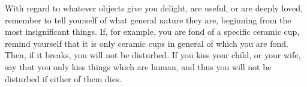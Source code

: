 With regard  to whatever objects  give you delight,  are useful, or  are deeply
loved, remember  to tell yourself  of what  general nature they  are, beginning
from the most insignificant things. If, for example, you are fond of a specific
ceramic cup, remind yourself  that it is only ceramic cups  in general of which
you are fond. Then,  if it breaks, you will not be disturbed.  If you kiss your
child, or your  wife, say that you  only kiss things which are  human, and thus
you will not be disturbed if either of them dies.
